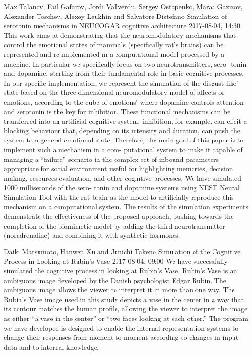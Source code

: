 \documentclass[10pt,fleqn,openany]{book} %
\begin{document}
\begin{enumerate}
		
		\paperabstract
		{Max Talanov, Fail Gafarov, Jordi Vallverdu, Sergey Ostapenko, Marat Gazizov, Alexander Toschev, Alexey Leukhin and Salvatore Distefano}
		{Simulation of serotonin mechanisms in NEUCOGAR cognitive architecture}
		{2017-08-04, 14:30}
		{This work aims at demonstrating that the neuromodulatory mechanisms that control the emotional states of mammals (specifically rat's brains) can be represented and re-implemented in a computational model processed by a machine. In particular we specifically focus on two neurotransmitters, sero- tonin and dopamine, starting from their fundamental role in basic cognitive processes. In our specific implementation, we represent the simulation of the disgust-like' state based on the three dimensional neuromodulatory model of affects or emotions, according to the cube of emotions' where dopamine controls attention and serotonin is the key for inhibition. These functional mechanisms can be transferred into an artificial cognitive system: inhibition, for example, can elicit a blocking behaviour that, depending on its intensity and duration, can push the system to a general emotional state. Therefore, the main goal of this paper is to implement such a mechanism in a com- putational system to make it capable of managing a ``failure'' scenario in the complex set of inbound parameters appropriate for social environment useful for highlighting memories, decision making, resources evaluation, and other cognitive processes. We have simulated 1000 milliseconds of the sero- tonin and dopamine systems using NEST Neural Simulation Tool with the rat brain as the model to artificially reproduce this mechanism on a computational system. The results of the simulation experiments demonstrate the effectiveness of the proposed approach, pushing towards the completion of the biomimetic model by adding the third neurotransmitter (noradrenaline) and combining it with synthetic hormones.}
		
		
		\paperabstract
		{Daiki Matsumoto, Hanwen Xu and Junichi Takeno}
		{Simulation of the Cognitive Process in Looking at Rubin's Vase}
		{2017-08-04, 09:00}
		{We have successfully simulated the cognitive process in looking at Rubin's Vase. Rubin's Vase is an ambiguous image developed by the Danish psychologist Edgar Rubin. The ambiguous image allows the viewer to interpret it in more than one way. The Rubin's Vase image used in this study depicts a vase in the center in a way that its contour matches the human profile, allowing the viewer to interpret the image as either ``a vase in the center'' or ``two faces looking at each other.'' The program we have developed is designed to enable the internal representation systems to change their responses from moment to moment according to changes in input data and to internal knowledge.}
		

\end{enumerate}
\end{document}
